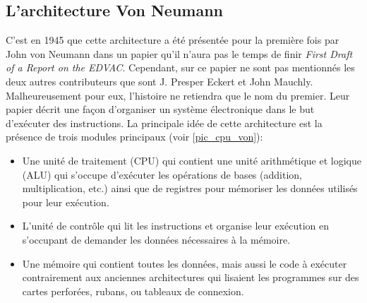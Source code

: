 \subsection{L'architecture Von Neumann}

C'est en 1945 que cette architecture a été présentée pour la première fois par John von Neumann dans un papier qu'il n'aura pas le temps de finir \textit{First Draft of a Report on the EDVAC}. Cependant, sur ce papier ne sont pas mentionnés les deux autres contributeurs que sont J. Presper Eckert et John Mauchly. Malheureusement pour eux, l'histoire ne retiendra que le nom du premier. Leur papier décrit une façon d'organiser un système électronique dans le but d'exécuter des instructions. La principale idée de cette architecture est la présence de trois modules principaux (voir \autoref{pic_cpu_von}):
 \begin{itemize}
    \item Une unité de traitement (CPU) qui contient une unité arithmétique et logique (ALU) qui s'occupe d'exécuter les opérations de bases (addition, multiplication, etc.) ainsi que de registres pour mémoriser les données utilisés pour leur exécution.
    \item L'unité de contrôle qui lit les instructions et organise leur exécution en s'occupant de demander les données nécessaires à la mémoire.
    \item Une mémoire qui contient toutes les données, mais aussi le code à exécuter contrairement aux anciennes architectures qui lisaient les programmes sur des cartes perforées, rubans, ou tableaux de connexion.
 \end{itemize}


